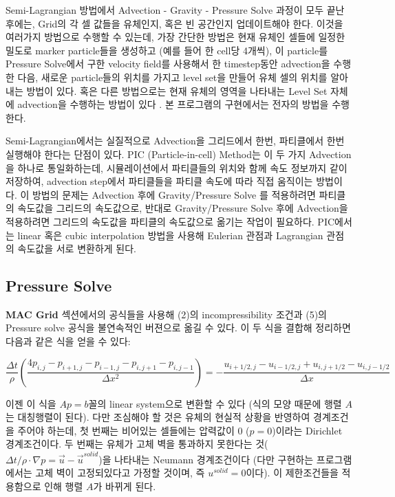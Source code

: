 \documentclass[12pt, A4]{article}
\begin{document}
Semi-Lagrangian 방법에서 Advection - Gravity - Pressure Solve 과정이 모두 끝난 후에는, Grid의 각 셀 값들을 유체인지, 혹은 빈 공간인지 업데이트해야 한다. 이것을 여러가지 방법으로 수행할 수 있는데, 가장 간단한 방법은 현재 유체인 셀들에 일정한 밀도로 marker particle들을 생성하고 (예를 들어 한 cell당 4개씩), 이 particle를 Pressure Solve에서 구한 velocity field를 사용해서 한 timestep동안 advection을 수행한 다음, 새로운 particle들의 위치를 가지고 level set을 만들어 유체 셀의 위치를 알아내는 방법이 있다. 혹은 다른 방법으로는 현재 유체의 영역을 나타내는 Level Set 자체에 advection을 수행하는 방법이 있다 \cite[p.57]{fluid-sim-cg}. 본 프로그램의 구현에서는 전자의 방법을 수행한다.

Semi-Lagrangian에서는 실질적으로 Advection을 그리드에서 한번, 파티클에서 한번 실행해야 한다는 단점이 있다. PIC (Particle-in-cell) Method는 이 두 가지 Advection을 하나로 통일화하는데, 시뮬레이션에서 파티클들의 위치와 함께 속도 정보까지 같이 저장하여, advection step에서 파티클들을 파티클 속도에 따라 직접 움직이는 방법이다. 이 방법의 문제는 Advection 후에 Gravity/Pressure Solve 를 적용하려면 파티클의 속도값을 그리드의 속도값으로, 반대로 Gravity/Pressure Solve 후에 Advection을 적용하려면 그리드의 속도값을 파티클의 속도값으로 옮기는 작업이 필요하다. PIC에서는 linear 혹은 cubic interpolation 방법을 사용해 Eulerian 관점과 Lagrangian 관점의 속도값을 서로 변환하게 된다. \cite[p.116-117]{fluid-sim-cg}

\subsection{Pressure Solve}

\textbf{MAC Grid} 섹션에서의 공식들을 사용해 (2)의 incompressibility 조건과 (5)의 Pressure solve 공식을 불연속적인 버젼으로 옮길 수 있다. 이 두 식을 결합해 정리하면 다음과 같은 식을 얻을 수 있다:

\begin{equation}
  \frac{\Delta t}{\rho} (\frac{4p_{i,j} - p_{i+1,j} - p_{i-1,j} - p_{i,j+1} - p_{i,j-1}}{\Delta x^2}) = -\frac{u_{i+1/2,j} - u_{i-1/2,j} + u_{i,j+1/2} - u_{i,j-1/2}}{\Delta x}
\end{equation}

이젠 이 식을 $Ap = b$꼴의 linear system으로 변환할 수 있다 (식의 모양 때문에 행렬 $A$는 대칭행렬이 된다). 다만 조심해야 할 것은 유체의 현실적 상황을 반영하여 경계조건을 주어야 하는데, 첫 번째는 비어있는 셀들에는 압력값이 0 ($p = 0$)이라는 Dirichlet 경계조건이다. 두 번째는 유체가 고체 벽을 통과하지 못한다는 것($\Delta t / \rho \cdot \nabla p = \vec{u} - \vec{u}^{solid}$)을 나타내는 Neumann 경계조건이다 \cite[p. 69-70]{fluid-sim-cg} (다만 구현하는 프로그램에서는 고체 벽이 고정되있다고 가정할 것이며, 즉 $u^{solid} = 0$이다). 이 제한조건들을 적용함으로 인해 행렬 $A$가 바뀌게 된다.
\end{document}
